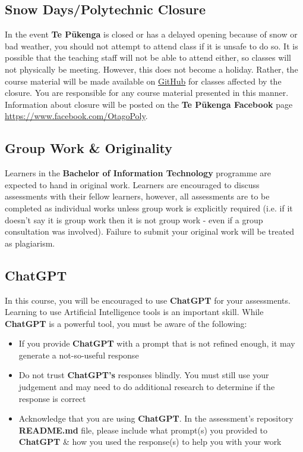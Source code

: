 \documentclass{article}
\begin{document}
\subsection*{Snow Days/Polytechnic Closure}
In the event \textbf{Te Pūkenga} is closed or has a delayed opening because of snow or bad weather, you should not attempt to attend class if it is unsafe to do so. It is possible that the teaching staff will not be able to attend either, so classes will not physically be meeting. However, this does not become a holiday. Rather, the course material will be made available on \href{https://github.com/otago-polytechnic-bit-courses/ID607001-intro-app-dev-concepts}{GitHub} for classes affected by the closure. You are responsible for any course material presented in this manner. Information about closure will be posted on the \textbf{Te Pūkenga Facebook} page \href{https://www.facebook.com/OtagoPoly}{https://www.facebook.com/OtagoPoly}.

\subsection*{Group Work \& Originality}
Learners in the \textbf{Bachelor of Information Technology} programme are expected to hand in original work. Learners are encouraged to discuss assessments with their fellow learners, however, all assessments are to be completed as individual works unless group work is explicitly required (i.e. if it doesn't say it is group work then it is not group work - even if a group consultation was involved). Failure to submit your original work will be treated as plagiarism.

\subsection*{ChatGPT}
In this course, you will be encouraged to use \textbf{ChatGPT} for your assessments. Learning to use Artificial Intelligence tools is an important skill. While \textbf{ChatGPT} is a powerful tool, you must be aware of the following:

\begin{itemize}
    \item If you provide \textbf{ChatGPT} with a prompt that is not refined enough, it may generate a not-so-useful response
    \item Do not trust \textbf{ChatGPT's} responses blindly. You must still use your judgement and may need to do additional research to determine if the response is correct
    \item Acknowledge that you are using \textbf{ChatGPT}. In the assessment's repository \textbf{README.md} file, please include what prompt(s) you provided to \textbf{ChatGPT} \& how you used the response(s) to help you with your work
\end{itemize}
\end{document}
